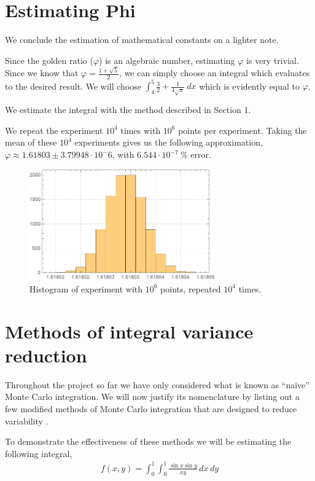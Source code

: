 \documentclass[12pt]{article}
\numberwithin{equation}{section}
\begin{document}
\section{Estimating Phi}
We conclude the estimation of mathematical constants on a lighter note.
\par Since the golden ratio ($\varphi$) is an algebraic number, estimating $\varphi$ is very trivial. Since we know that $\varphi = \frac{1+\sqrt{5}}{2}$, we can simply choose an integral which evaluates to the desired result. We will choose $\int_4^5 \frac{3}{2}+\frac{1}{4 \sqrt{x}}\ dx$ which is evidently equal to $\varphi$.
\par We estimate the integral with the method described in Section 1.
\par We repeat the experiment $10^4$ times with $10^6$ points per experiment. Taking the mean of these $10^4$ experiments gives us the following approximation, $\varphi \approx 1.61803 \pm 3.79948 \cdot 10^-6$, with $6.544 \cdot 10^{-7}\ \%$ error.
\begin{figure}[!htb]
    \centering
    \includegraphics[width=8cm]{Images/repeatedphi.png}
    \caption{Histogram of experiment with $10^6$ points, repeated $10^4$ times.}
    \label{fig:repeatedphi}
\end{figure}
\FloatBarrier
\section{Methods of integral variance reduction}
Throughout the project so far we have only considered what is known as ``naïve'' Monte Carlo integration. We will now justify its nomenclature by listing out a few modified methods of Monte Carlo integration that are designed to reduce variability \cite{caflisch_1998, anithetic}.
\par To demonstrate the effectiveness of these methods we will be estimating the following integral,
\begin{align}
    f(x,y)=\int_0^1 \int_0^1 \frac{\sin x \sin y}{x y}\, dx\, dy \label{sinx}
\end{align}
\par
\end{document}
